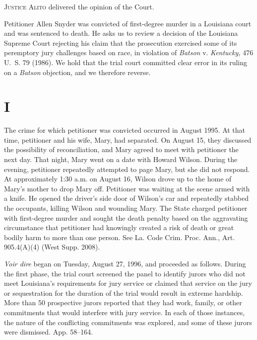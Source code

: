
\setcounter{page}{474}

  \textsc{Justice Alito} delivered the opinion of the Court.

  Petitioner Allen Snyder was convicted of first-degree murder in a
Louisiana court and was sentenced to death. He asks us to review a
decision of the Louisiana Supreme Court rejecting his claim that the
prosecution exercised some of its peremptory jury challenges based
on race, in violation of \emph{Batson} v. \emph{Kentucky,} 476 U.~S. 79
(1986). We hold that the trial court committed clear error in its
ruling on a \emph{Batson} objection, and we therefore reverse.

\section{I}

  The crime for which petitioner was convicted occurred in August 1995.
At that time, petitioner and his wife, Mary, had separated. On August
15, they discussed the possibility of reconciliation, and Mary agreed
to meet with petitioner the next day. That night, Mary went on a date
with Howard Wilson. During the evening, petitioner repeatedly attempted
to page Mary, but she did not respond. At approximately 1:30 a.m. on
August 16, Wilson drove up to the home of Mary's mother to drop Mary
off. Petitioner was waiting at the scene armed with a knife. He opened
the driver's side door of Wilson's car and repeatedly stabbed the
occu\newpage  pants, killing Wilson and wounding Mary. The State charged
petitioner with first-degree murder and sought the death penalty based
on the aggravating circumstance that petitioner had knowingly created a
risk of death or great bodily harm to more than one person. See La.
Code Crim. Proc. Ann., Art. 905.4(A)(4) (West Supp. 2008).

  \emph{Voir dire} began on Tuesday, August 27, 1996, and proceeded as
follows. During the first phase, the trial court screened the panel
to identify jurors who did not meet Louisiana's requirements for
jury service or claimed that service on the jury or sequestration for
the duration of the trial would result in extreme hardship. More than
50 prospective jurors reported that they had work, family, or other
commitments that would interfere with jury service. In each of those
instances, the nature of the conflicting commitments was explored, and
some of these jurors were dismissed. App. 58--164.

